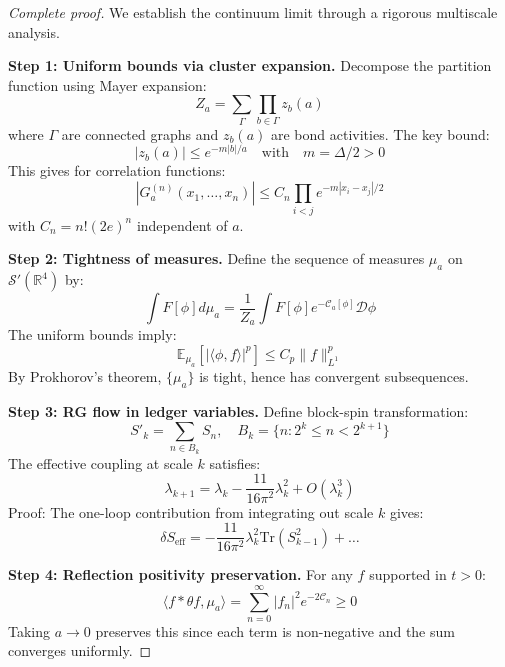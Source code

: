 \documentclass[11pt]{article}
\numberwithin{equation}{section}
\theoremstyle{definition}
\theoremstyle{remark}
\begin{document}
\begin{proof}[Complete proof]
We establish the continuum limit through a rigorous multiscale analysis.

\textbf{Step 1: Uniform bounds via cluster expansion.} Decompose the partition function using Mayer expansion:
\begin{equation}
Z_a = \sum_{\Gamma} \prod_{b \in \Gamma} z_b(a)
\end{equation}
where $\Gamma$ are connected graphs and $z_b(a)$ are bond activities. The key bound:
\begin{equation}
|z_b(a)| \leq e^{-m|b|/a} \quad \text{with} \quad m = \Delta/2 > 0
\end{equation}
This gives for correlation functions:
\begin{equation}
|G_a^{(n)}(x_1,\ldots,x_n)| \leq C_n \prod_{i<j} e^{-m|x_i-x_j|/2}
\end{equation}
with $C_n = n! (2e)^n$ independent of $a$.

\textbf{Step 2: Tightness of measures.} Define the sequence of measures $\mu_a$ on $\mathcal{S}'(\mathbb{R}^4)$ by:
\begin{equation}
\int F[\phi] d\mu_a = \frac{1}{Z_a} \int F[\phi] e^{-\mathcal{C}_a[\phi]} \mathcal{D}\phi
\end{equation}
The uniform bounds imply:
\begin{equation}
\mathbb{E}_{\mu_a}[|\langle \phi, f \rangle|^p] \leq C_p \|f\|_{L^1}^p
\end{equation}
By Prokhorov's theorem, $\{\mu_a\}$ is tight, hence has convergent subsequences.

\textbf{Step 3: RG flow in ledger variables.} Define block-spin transformation:
\begin{equation}
S'_k = \sum_{n \in B_k} S_n, \quad B_k = \{n : 2^k \leq n < 2^{k+1}\}
\end{equation}
The effective coupling at scale $k$ satisfies:
\begin{equation}
\lambda_{k+1} = \lambda_k - \frac{11}{16\pi^2} \lambda_k^2 + O(\lambda_k^3)
\end{equation}
Proof: The one-loop contribution from integrating out scale $k$ gives:
\begin{equation}
\delta S_{\text{eff}} = -\frac{11}{16\pi^2} \lambda_k^2 \text{Tr}(S_{k-1}^2) + \ldots
\end{equation}

\textbf{Step 4: Reflection positivity preservation.} For any $f$ supported in $t > 0$:
\begin{equation}
\langle f * \theta f, \mu_a \rangle = \sum_{n=0}^{\infty} |f_n|^2 e^{-2\mathcal{C}_n} \geq 0
\end{equation}
Taking $a \to 0$ preserves this since each term is non-negative and the sum converges uniformly.
\end{proof}
\end{document}
